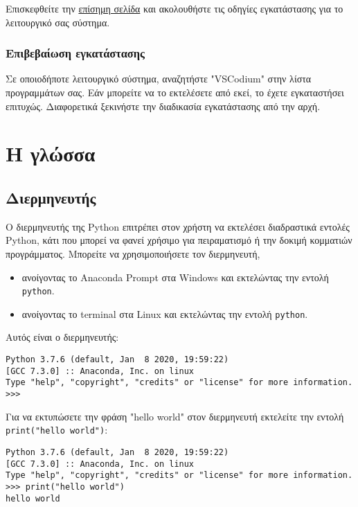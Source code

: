\documentclass[12pt]{extreport}
\begin{document}
Επισκεφθείτε την \href{https://vscodium.com/#install}{επίσημη σελίδα} και ακολουθήστε τις οδηγίες εγκατάστασης για το λειτουργικό σας σύστημα.

\subsubsection{Επιβεβαίωση εγκατάστασης}
Σε οποιοδήποτε λειτουργικό σύστημα, αναζητήστε "VSCodium" στην λίστα προγραμμάτων σας. Εάν μπορείτε να το εκτελέσετε από εκεί, το έχετε εγκαταστήσει επιτυχώς. Διαφορετικά ξεκινήστε την διαδικασία εγκατάστασης από την αρχή.

\section{Η γλώσσα}
\subsection{Διερμηνευτής}

Ο διερμηνευτής της Python επιτρέπει στον χρήστη να εκτελέσει διαδραστικά εντολές Python, κάτι που μπορεί να φανεί χρήσιμο για πειραματισμό ή την δοκιμή κομματιών προγράμματος. Μπορείτε να χρησιμοποιήσετε τον διερμηνευτή,

\begin{itemize}
    \item ανοίγοντας το Anaconda Prompt στα Windows και εκτελώντας την εντολή \lstinline{python}.
    \item ανοίγοντας το terminal στα Linux και εκτελώντας την εντολή \lstinline{python}.
\end{itemize}

Αυτός είναι ο διερμηνευτής:

\begin{lstlisting}[numbers=none]
Python 3.7.6 (default, Jan  8 2020, 19:59:22) 
[GCC 7.3.0] :: Anaconda, Inc. on linux
Type "help", "copyright", "credits" or "license" for more information.
>>> 
\end{lstlisting}

Για να εκτυπώσετε την φράση "hello world" στον διερμηνευτή εκτελείτε  την εντολή \lstinline{print("hello world")}:
\begin{lstlisting}[numbers=none]
Python 3.7.6 (default, Jan  8 2020, 19:59:22) 
[GCC 7.3.0] :: Anaconda, Inc. on linux
Type "help", "copyright", "credits" or "license" for more information.
>>> print("hello world")
hello world
\end{lstlisting}
\end{document}
